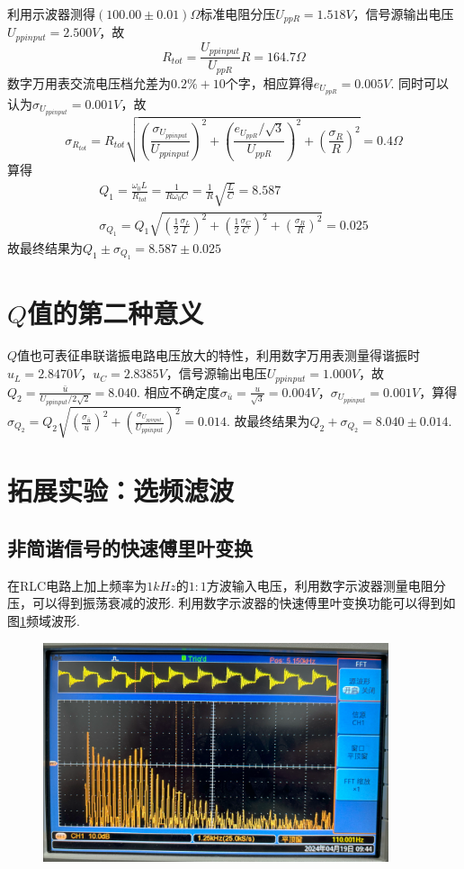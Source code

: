 \documentclass[12pt, a4paper]{ctexart}
\begin{document}
利用示波器测得$(100.00 \pm 0.01)\Omega$标准电阻分压$U_{ppR} = 1.518V$，信号源输出电压$U_{ppinput} = 2.500V$，故
\begin{equation*}
  R_{tot} = \frac{U_{ppinput}}{U_{ppR}}R = 164.7\Omega
\end{equation*}
数字万用表交流电压档允差为$0.2\% + 10$个字，相应算得$e_{U_{ppR}} = 0.005V$.
同时可以认为$\sigma_{U_{ppinput}} = 0.001V$，故
\begin{equation*}
  \sigma_{R_{tot}} = R_{tot}\sqrt{(\frac{\sigma_{U_{ppinput}}}{U_{ppinput}})^2 + (\frac{e_{U_{ppR}}/\sqrt{3}}{U_{ppR}})^2 + (\frac{\sigma_{R}}{R})^2} = 0.4\Omega
\end{equation*}
算得
\begin{gather*}
  Q_1 = \frac{\omega_0 L}{R_{tot}} = \frac{1}{R \omega_0 C} = \frac{1}{R}\sqrt{\frac{L}{C}} = 8.587\\
  \sigma_{Q_1} = Q_1\sqrt{(\frac{1}{2}\frac{\sigma_L}{L})^2 + (\frac{1}{2}\frac{\sigma_C}{C})^2 + (\frac{\sigma_R}{R})^2} = 0.025
\end{gather*}
故最终结果为$Q_1 \pm \sigma_{Q_1} = 8.587 \pm 0.025$

\section{$Q$值的第二种意义}
$Q$值也可表征串联谐振电路电压放大的特性，利用数字万用表测量得谐振时$u_L = 2.8470V$，$u_C = 2.8385V$，信号源输出电压$U_{ppinput} = 1.000V$，故$Q_2 = \frac{\bar{u}}{U_{ppinput}/2\sqrt{2}} = 8.040$.
相应不确定度$\sigma_{\bar{u}} = \frac{u}{\sqrt{3}} = 0.004V$，$\sigma_{U_{ppinput}} = 0.001V$，算得$\sigma_{Q_2} = Q_2\sqrt{(\frac{\sigma_{\bar{u}}}{\bar{u}})^2 + (\frac{\sigma_{U_{ppinput}}}{U_{ppinput}})^2} = 0.014$.
故最终结果为$Q_2 + \sigma_{Q_2} = 8.040 \pm 0.014$.

\section{拓展实验：选频滤波}
\subsection{非简谐信号的快速傅里叶变换}
在RLC电路上加上频率为$1kHz$的$1:1$方波输入电压，利用数字示波器测量电阻分压，可以得到振荡衰减的波形.
利用数字示波器的快速傅里叶变换功能可以得到如图\ref{fig3}频域波形.
\begin{figure}[htbp]
  \centering
  \includegraphics[width = 4in]{figure/FFT.png}
  \caption{}
  \label{fig3}
\end{figure}
\end{document}
